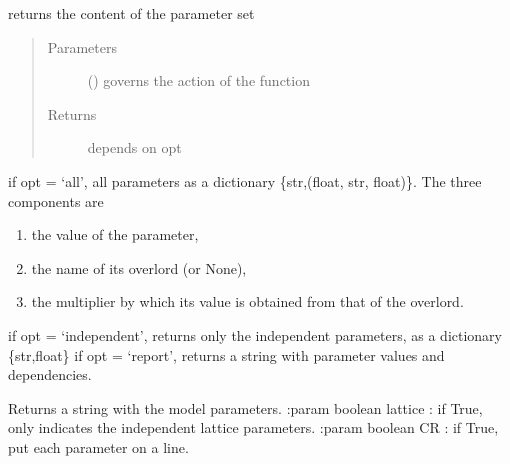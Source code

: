 \documentclass[letterpaper,10pt,english]{sphinxmanual}
\begin{document}
\begin{fulllineitems}
\label{\detokenize{functions:pyqcm.parameter_set}}
\sphinxAtStartPar
returns the content of the parameter set
\begin{quote}\begin{description}
\item[{Parameters}] \leavevmode
\sphinxAtStartPar
{} () \textendash{} governs the action of the function

\item[{Returns}] \leavevmode
\sphinxAtStartPar
depends on opt

\end{description}\end{quote}

\sphinxAtStartPar
if opt = ‘all’, all parameters as a dictionary \{str,(float, str, float)\}. The three components are
\begin{enumerate}
%
\item {} 
\sphinxAtStartPar
the value of the parameter,

\item {} 
\sphinxAtStartPar
the name of its overlord (or None),

\item {} 
\sphinxAtStartPar
the multiplier by which its value is obtained from that of the overlord.

\end{enumerate}

\sphinxAtStartPar
if opt = ‘independent’, returns only the independent parameters, as a dictionary \{str,float\}
if opt = ‘report’, returns a string with parameter values and dependencies.

\end{fulllineitems}


\begin{fulllineitems}
\label{\detokenize{functions:pyqcm.parameter_string}}
\sphinxAtStartPar
Returns a string with the model parameters. 
:param boolean lattice : if True, only indicates the independent lattice parameters.
:param boolean CR : if True, put each parameter on a line.

\end{fulllineitems}
\end{document}
